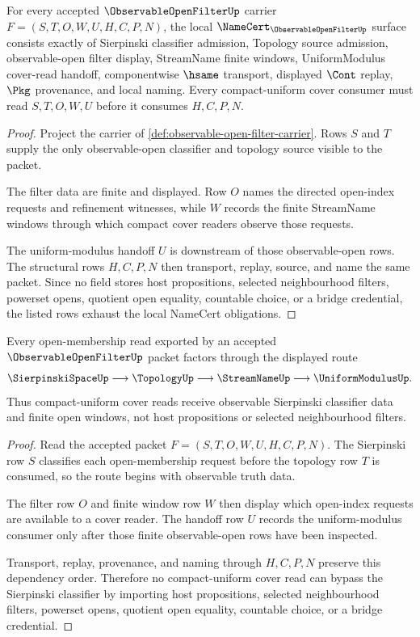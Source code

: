 \begin{theorem}
\label{thm:observable-open-filter-namecert-obligations}
For every accepted $\ObservableOpenFilterUp$ carrier $F=(S,T,O,W,U,H,C,P,N)$, the local $\NameCert_{\ObservableOpenFilterUp}$ surface consists exactly of Sierpinski classifier admission, Topology source admission, observable-open filter display, StreamName finite windows, UniformModulus cover-read handoff, componentwise $\hsame$ transport, displayed $\Cont$ replay, $\Pkg$ provenance, and local naming. Every compact-uniform cover consumer must read $S,T,O,W,U$ before it consumes $H,C,P,N$.
\end{theorem}
\begin{proof}
Project the carrier of \autoref{def:observable-open-filter-carrier}. Rows $S$ and $T$ supply the only observable-open classifier and topology source visible to the packet.

The filter data are finite and displayed. Row $O$ names the directed open-index requests and refinement witnesses, while $W$ records the finite StreamName windows through which compact cover readers observe those requests.

The uniform-modulus handoff $U$ is downstream of those observable-open rows. The structural rows $H,C,P,N$ then transport, replay, source, and name the same packet. Since no field stores host propositions, selected neighbourhood filters, powerset opens, quotient open equality, countable choice, or a bridge credential, the listed rows exhaust the local NameCert obligations.
\end{proof}

\begin{theorem}
\label{thm:observable-open-filter-sierpinski-handoff}
Every open-membership read exported by an accepted $\ObservableOpenFilterUp$ packet factors through the displayed route
$$
\SierpinskiSpaceUp \longrightarrow \TopologyUp \longrightarrow \StreamNameUp \longrightarrow \UniformModulusUp .
$$
Thus compact-uniform cover reads receive observable Sierpinski classifier data and finite open windows, not host propositions or selected neighbourhood filters.
\end{theorem}
\begin{proof}
Read the accepted packet $F=(S,T,O,W,U,H,C,P,N)$. The Sierpinski row $S$ classifies each open-membership request before the topology row $T$ is consumed, so the route begins with observable truth data.

The filter row $O$ and finite window row $W$ then display which open-index requests are available to a cover reader. The handoff row $U$ records the uniform-modulus consumer only after those finite observable-open rows have been inspected.

Transport, replay, provenance, and naming through $H,C,P,N$ preserve this dependency order. Therefore no compact-uniform cover read can bypass the Sierpinski classifier by importing host propositions, selected neighbourhood filters, powerset opens, quotient open equality, countable choice, or a bridge credential.
\end{proof}

